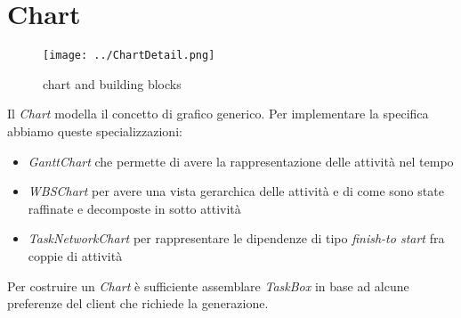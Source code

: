 \section{Chart}
\label{sec:chart}

\begin{figure}[h!] 
	\centering
	\texttt{[image: ../ChartDetail.png]}
	\caption{chart and building blocks}
	\label{fig:chart} 
\end{figure}

Il \emph{Chart} modella il concetto di grafico generico. Per implementare la
specifica abbiamo queste specializzazioni:
\begin{itemize}
  \item \emph{GanttChart} che permette di avere la rappresentazione delle
  attivit\`a nel tempo
  \item \emph{WBSChart} per avere una vista gerarchica delle attivit\`a e di
  come sono state raffinate e decomposte in sotto attivit\`a
  \item \emph{TaskNetworkChart} per rappresentare le dipendenze di tipo
  \emph{finish-to start} fra coppie di attivit\`a
\end{itemize}

Per costruire un \emph{Chart} \`e sufficiente assemblare \emph{TaskBox} in base
ad alcune preferenze del client che richiede la generazione.
